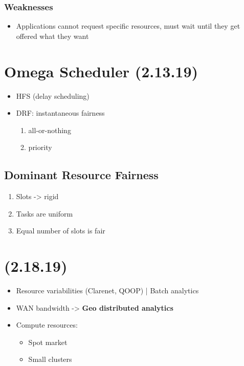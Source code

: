 \documentclass[11pt]{article}
\begin{document}
\subsubsection{Weaknesses}
\label{sec:orgheadline14}
\begin{itemize}
\item Applications cannot request specific resources, must wait until they get offered what they want
\end{itemize}

\section{Omega Scheduler (2.13.19)}
\label{sec:orgheadline18}
\begin{itemize}
\item HFS (delay scheduling)
\item DRF: instantaneous fairness

\begin{enumerate}
\item all-or-nothing
\item priority
\end{enumerate}
\end{itemize}

\subsection{Dominant Resource Fairness}
\label{sec:orgheadline17}
\begin{enumerate}
\item Slots -> rigid
\item Tasks are uniform
\item Equal number of slots is fair
\end{enumerate}
\section{(2.18.19)}
\label{sec:orgheadline23}
\begin{itemize}
\item Resource variabilities (Clarenet, QOOP) | Batch analytics
\item WAN bandwidth -> \textbf{Geo distributed analytics}
\item Compute resources:
\begin{itemize}
\item Spot market
\item Small clusters
\end{itemize}
\end{itemize}
\end{document}
